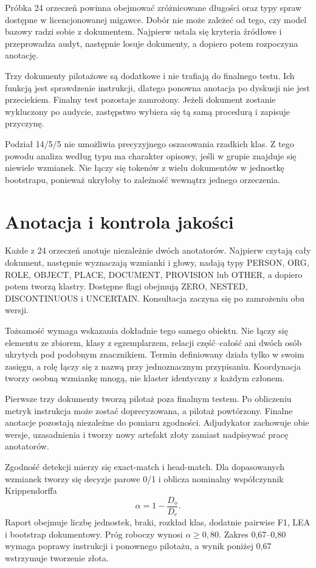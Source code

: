 Próbka 24 orzeczeń powinna obejmować zróżnicowane długości oraz typy spraw dostępne w licencjonowanej migawce. Dobór nie może zależeć od tego, czy model bazowy radzi sobie z dokumentem. Najpierw ustala się kryteria źródłowe i przeprowadza audyt, następnie losuje dokumenty, a dopiero potem rozpoczyna anotację.

Trzy dokumenty pilotażowe są dodatkowe i nie trafiają do finalnego testu. Ich funkcją jest sprawdzenie instrukcji, dlatego ponowna anotacja po dyskusji nie jest przeciekiem. Finalny test pozostaje zamrożony. Jeżeli dokument zostanie wykluczony po audycie, zastępstwo wybiera się tą samą procedurą i zapisuje przyczynę.

Podział 14/5/5 nie umożliwia precyzyjnego oszacowania rzadkich klas. Z tego powodu analiza według typu ma charakter opisowy, jeśli w grupie znajduje się niewiele wzmianek. Nie łączy się tokenów z wielu dokumentów w jednostkę bootstrapu, ponieważ ukryłoby to zależność wewnątrz jednego orzeczenia.

\section{Anotacja i kontrola jakości}
\label{sec:anotacja}

Każde z 24 orzeczeń anotuje niezależnie dwóch anotatorów. Najpierw czytają cały dokument, następnie wyznaczają wzmianki i głowy, nadają typy PERSON, ORG, ROLE, OBJECT, PLACE, DOCUMENT, PROVISION lub OTHER, a dopiero potem tworzą klastry. Dostępne flagi obejmują ZERO, NESTED, DISCONTINUOUS i UNCERTAIN. Konsultacja zaczyna się po zamrożeniu obu wersji.

Tożsamość wymaga wskazania dokładnie tego samego obiektu. Nie łączy się elementu ze zbiorem, klasy z egzemplarzem, relacji część--całość ani dwóch osób ukrytych pod podobnym znacznikiem. Termin definiowany działa tylko w swoim zasięgu, a rolę łączy się z nazwą przy jednoznacznym przypisaniu. Koordynacja tworzy osobną wzmiankę mnogą, nie klaster identyczny z każdym członem.

Pierwsze trzy dokumenty tworzą pilotaż poza finalnym testem. Po obliczeniu metryk instrukcja może zostać doprecyzowana, a pilotaż powtórzony. Finalne anotacje pozostają niezależne do pomiaru zgodności. Adjudykator zachowuje obie wersje, uzasadnienia i tworzy nowy artefakt złoty zamiast nadpisywać pracę anotatorów.

Zgodność detekcji mierzy się exact-match i head-match. Dla dopasowanych wzmianek tworzy się decyzje parowe 0/1 i oblicza nominalny współczynnik Krippendorffa
\[
\alpha=1-\frac{D_o}{D_e}.
\]
Raport obejmuje liczbę jednostek, braki, rozkład klas, dodatnie pairwise F1, LEA i bootstrap dokumentowy. Próg roboczy wynosi $\alpha\geq0{,}80$. Zakres 0,67--0,80 wymaga poprawy instrukcji i ponownego pilotażu, a wynik poniżej 0,67 wstrzymuje tworzenie złota.

